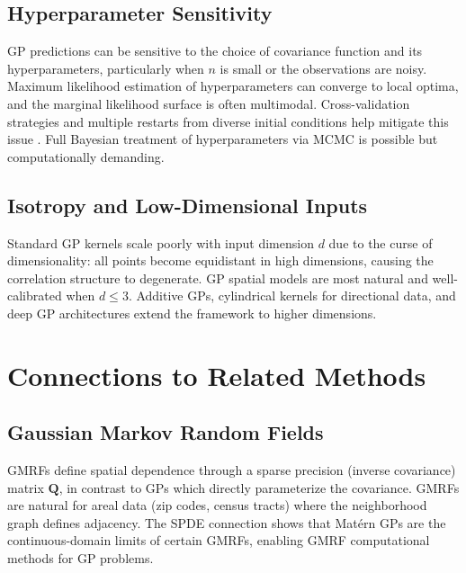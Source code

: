 \documentclass[conference]{IEEEtran}
\begin{document}
\subsection{Hyperparameter Sensitivity}

GP predictions can be sensitive to the choice of covariance function and its hyperparameters, particularly when $n$ is small or the observations are noisy. Maximum likelihood estimation of hyperparameters can converge to local optima, and the marginal likelihood surface is often multimodal. Cross-validation strategies and multiple restarts from diverse initial conditions help mitigate this issue \cite{rasmussen2006gaussian}. Full Bayesian treatment of hyperparameters via MCMC is possible but computationally demanding.

\subsection{Isotropy and Low-Dimensional Inputs}

Standard GP kernels scale poorly with input dimension $d$ due to the curse of dimensionality: all points become equidistant in high dimensions, causing the correlation structure to degenerate. GP spatial models are most natural and well-calibrated when $d \leq 3$. Additive GPs, cylindrical kernels for directional data, and deep GP architectures extend the framework to higher dimensions.

\section{Connections to Related Methods}
\label{sec:related}

\subsection{Gaussian Markov Random Fields}

GMRFs \cite{rue2005gaussian} define spatial dependence through a sparse precision (inverse covariance) matrix $\mathbf{Q}$, in contrast to GPs which directly parameterize the covariance. GMRFs are natural for areal data (zip codes, census tracts) where the neighborhood graph defines adjacency. The SPDE connection \cite{lindgren2011explicit} shows that Mat\'{e}rn GPs are the continuous-domain limits of certain GMRFs, enabling GMRF computational methods for GP problems.
\end{document}
